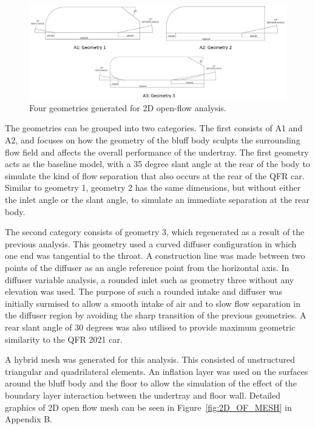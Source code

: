 \begin{figure}[!ht]
    \centering
    \includegraphics[scale = 0.5]{Figures/2D_OF/2D_OF_GEOM.png}
    \caption{Four geometries generated for 2D open-flow analysis.}
    \label{fig:2D_OF_GEOM}
\end{figure}

\noindent The geometries can be grouped into two categories. The first consists of A1 and A2, and focuses on how the geometry of the bluff body sculpts the surrounding flow field and affects the overall performance of the undertray. The first geometry acts as the baseline model, with a 35 degree slant angle at the rear of the body to simulate the kind of flow separation that also occurs at the rear of the QFR car. Similar to geometry 1, geometry 2 has the same dimensions, but without either the inlet angle or the slant angle, to simulate an immediate separation at the rear body.

\noindent The second category consists of geometry 3, which regenerated as a result of the previous analysis. This geometry used a curved diffuser configuration in which one end was tangential to the throat. A construction line was made between two points of the diffuser as an angle reference point from the horizontal axis. In diffuser variable analysis, a rounded inlet such as geometry three without any elevation was used. The purpose of such a rounded intake and diffuser was initially surmised to allow a smooth intake of air and to slow flow separation in the diffuser region by avoiding the sharp transition of the previous geometries. A rear slant angle of 30 degrees was also utilised to provide maximum geometric similarity to the QFR 2021 car.

\noindent A hybrid mesh was generated for this analysis. This consisted of unstructured triangular and quadrilateral elements. An inflation layer was used on the surfaces around the bluff body and the floor to allow the simulation of the effect of the boundary layer interaction between the undertray and floor wall. Detailed graphics of 2D open flow mesh can be seen in Figure~\ref{fig:2D_OF_MESH} in Appendix B.

